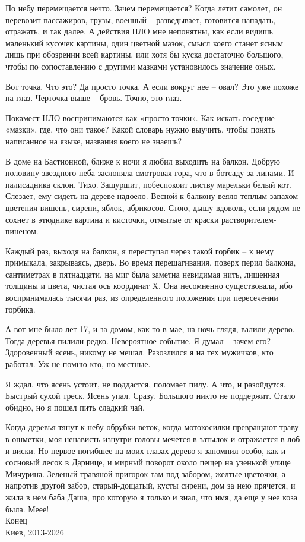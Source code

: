 По небу перемещается нечто. Зачем перемещается? Когда летит самолет, он перевозит пассажиров, грузы, военный – разведывает, готовится нападать, отражать, и так далее. А действия НЛО мне непонятны, как если видишь маленький кусочек картины, один цветной мазок, смысл коего станет ясным лишь при обозрении всей картины, или хотя бы куска достаточно большого, чтобы по сопоставлению с другими мазками установилось значение оных.

Вот точка. Что это? Да просто точка. А если вокруг нее – овал? Это уже похоже на глаз. Черточка выше – бровь. Точно, это глаз.

Покамест НЛО воспринимаются как «просто точки». Как искать соседние «мазки», где, что они такое? Какой словарь нужно выучить, чтобы понять написанное на языке, названия коего не знаешь?

В доме на Бастионной, ближе к ночи я любил выходить на балкон. Добрую половину звездного неба заслоняла смотровая гора, что в ботсаду за липами. И палисадника склон. Тихо. Зашуршит, побеспокоит листву марельки белый кот. Слезает, ему сидеть на дереве надоело. Весной к балкону веяло теплым запахом цветения вишень, сирени, яблок, абрикосов. Стою, дышу вдоволь, если рядом не сохнет в этюднике картина и кисточки, отмытые от краски растворителем-пиненом.

Каждый раз, выходя на балкон, я переступал через такой горбик – к нему примыкала, закрываясь, дверь. Во время перешагивания, поверх перил балкона, сантиметрах в пятнадцати, на миг была заметна невидимая нить, лишенная толщины и цвета, чистая ось координат X. Она несомненно существовала, ибо воспринималась тысячи раз, из определенного положения при пересечении горбика.

А вот мне было лет 17, и за домом, как-то в мае, на ночь глядя, валили дерево. Тогда деревья пилили редко. Невероятное событие. Я думал – зачем его? Здоровенный ясень, никому не мешал. Разозлился я на тех мужичков, кто работал. Уж не помню кто, но местные.

Я ждал, что ясень устоит, не поддастся, поломает пилу. А что, и разойдутся. Быстрый сухой треск. Ясень упал. Сразу. Большого никто не поддержит. Стало обидно, но я пошел пить сладкий чай. 

Когда деревья тянут к небу обрубки веток, когда мотокосилки превращают траву в ошметки, моя ненависть изнутри головы мечется в затылок и отражается в лоб и виски. Но первое погибшее на моих глазах дерево я запомнил особо, как и сосновый лесок в Дарнице, и мирный поворот около пещер на узенькой улице Мичурина. Зеленый травяной пригорок там под забором, желтые цветочки, а напротив другой забор, старый-дощатый, кусты сирени, дом за нею прячется, и жила в нем баба Даша, про которую я только и знал, что имя, да еще у нее коза была. Меее!\\

Конец\\

Киев, 2013-2026\\
